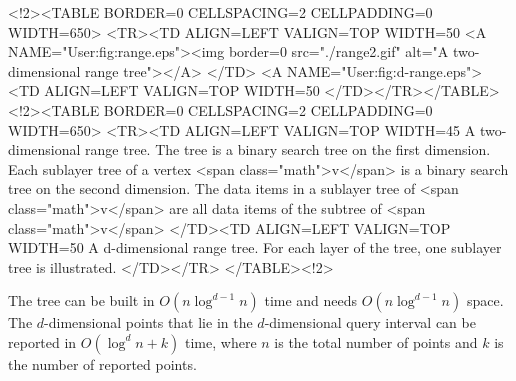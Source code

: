 \begin{ccHtmlOnly}
    <!2><TABLE BORDER=0 CELLSPACING=2 CELLPADDING=0 WIDTH=650>
        <TR><TD ALIGN=LEFT VALIGN=TOP WIDTH=50%
    <A NAME="User:fig:range.eps"><img border=0 src="./range2.gif" alt="A two-dimensional range tree"></A>
    </TD>
    <A NAME="User:fig:d-range.eps"><TD ALIGN=LEFT VALIGN=TOP WIDTH=50%
      </TD></TR></TABLE>
        <!2><TABLE BORDER=0 CELLSPACING=2 CELLPADDING=0 WIDTH=650>
        <TR><TD ALIGN=LEFT VALIGN=TOP WIDTH=45%
    A two-dimensional range tree. The
      tree is a binary search tree on the first dimension. Each
      sublayer tree of a vertex <span class="math">v</span> is a binary search tree on the
second
      dimension. The data items in a sublayer tree of <span class="math">v</span> are
      all data items of the subtree of <span class="math">v</span>
 </TD><TD ALIGN=LEFT VALIGN=TOP WIDTH=50%
A d-dimensional range tree. For
      each layer of the tree, one
      sublayer tree is illustrated.
 </TD></TR>
        </TABLE><!2>

\end{ccHtmlOnly}


The tree can be built in  $O(n\log^{d-1} n)$ time and
needs  $O(n\log^{d-1} n)$ space. The $d$-dimensional points that lie in the
$d$-dimensional query interval can be reported in $O(\log^dn+k)$ time,
where $n$ is the total number of points and $k$ is the number of
reported points. 
